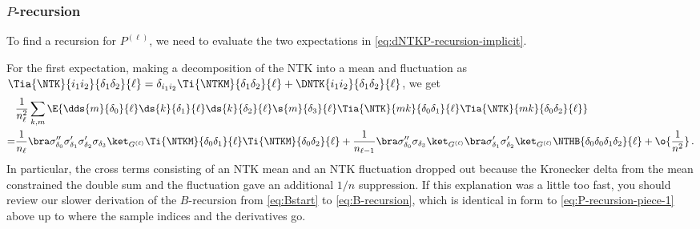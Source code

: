 \subsubsection{$P$-recursion}
To find a recursion for $P^{(\ell)}$, we need to evaluate the two expectations in \eqref{eq:dNTKP-recursion-implicit}.

For the first expectation, making a decomposition of the NTK into a mean and fluctuation as $\Tia{\NTK}{i_1i_2}{\delta_1\delta_2}{\ell}=\delta_{i_1i_2}\Ti{\NTKM}{\delta_1\delta_2}{\ell}+\DNTK{i_1i_2}{\delta_1\delta_2}{\ell}$, we get
\begin{align}\label{eq:P-recursion-piece-1}
&\frac{1}{n_{\ell}^2}\sum_{k,m}\E{\dds{m}{\delta_0}{\ell}\ds{k}{\delta_1}{\ell}\ds{k}{\delta_2}{\ell}\s{m}{\delta_3}{\ell}\Tia{\NTK}{mk}{\delta_0\delta_1}{\ell}\Tia{\NTK}{mk}{\delta_0\delta_2}{\ell}}\, \\
=&\frac{1}{n_{\ell}}\bra\sigma^{\prime\prime}_{\delta_0}\sigma^{\prime}_{\delta_1}\sigma^{\prime}_{\delta_2}\sigma_{\delta_3} \ket_{G^{(\ell)}}\Ti{\NTKM}{\delta_0\delta_1}{\ell}\Ti{\NTKM}{\delta_0\delta_2}{\ell}+\frac{1}{n_{\ell-1}}\bra\sigma^{\prime\prime}_{\delta_0} \sigma_{\delta_3} \ket_{G^{(\ell)}}\bra\sigma^{\prime}_{\delta_1} \sigma^{\prime}_{\delta_2}  \ket_{G^{(\ell)}} \NTHB{\delta_0\delta_0\delta_1\delta_2}{\ell}+\o{\frac{1}{n^2}}\, .\notag
\end{align}
In particular, the cross terms consisting of an NTK mean and an NTK fluctuation dropped out because the Kronecker delta from the mean constrained the double sum and the fluctuation gave an additional $1/n$ suppression.
If this explanation was a little too fast, you should review our slower derivation of the $B$-recursion from \eqref{eq:Bstart} to \eqref{eq:B-recursion}, which is identical in form to \eqref{eq:P-recursion-piece-1} above up to where the sample indices and the derivatives go.


